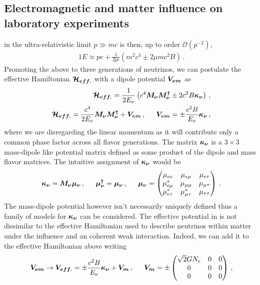 \subsection{Electromagnetic and matter influence on laboratory experiments}\label{rel}
\noindent{} in the ultra-relativistic limit $p\gg mc$ is then, up to order $\mathcal{O}(p^{-2})$,
\begin{alignat}{1}
	\label{eigen:3} E \approx pc + \frac{1}{2pc}\left(m^{2}c^{4}\pm2\mu mc^{2}B\right)\,.
\end{alignat}
Promoting the above to three generations of neutrinos, we can postulate the effective Hamiltonian $\boldsymbol{\mathcal{H}_{eff.}}$ with a dipole potential $\boldsymbol{V_{em}}$ as
\begin{alignat}{1}
	\label{heff:1} \bb{\mathcal{H}_{eff.}}=\frac{1}{2E_{\nu}}\left(c^{4}\bb{M_{\nu}}\bb{M_{\nu}^{\dagger}}\pm2c^{2}B\bb{\kappa_{\nu}}\right)\,,\\
	\label{heff:2} \bb{\mathcal{H}_{eff.}}=\frac{c^{4}}{2E_{\nu}}\bb{M_{\nu}}\bb{M_{\nu}^{\dagger}}+\bb{V_{em}}\,,\indent\bb{V_{em}}=\pm\frac{c^{2}B}{E_{\nu}}\bb{\kappa_{\nu}}\,,
\end{alignat}
where we are disregarding the linear momentum as it will contribute only a common phase factor across all flavor generations. \ar The matrix $\boldsymbol{\kappa_{\nu}}$ is a $3\times3$ mass-dipole like potential matrix defined as some product of the dipole and mass flavor matrices. The intuitive assignment of $\boldsymbol{\kappa_{\nu}}$ would be
\begin{alignat}{1}
	\label{kappa:1} \bb{\kappa_{\nu}} = \bb{M_\nu}\bb{\mu_{\nu}}\,,\indent\bb{\mu_{\nu}^{\dagger}}=\bb{\mu_{\nu}}\,,\indent\bb{\mu_{\nu}}=
	\begin{pmatrix}
		\mu_{ee} & \mu_{e\mu} & \mu_{e\tau} \\
		\mu_{e\mu}^{*} & \mu_{\mu\mu} & \mu_{\mu\tau} \\
		\mu_{e\tau}^{*} & \mu_{\mu\tau}^{*} & \mu_{\tau\tau}
	\end{pmatrix}\,.
\end{alignat}
The mass-dipole potential however isn't necessarily uniquely defined thus a family of models for $\boldsymbol{\kappa_{\nu}}$ can be considered. The effective potential in  is not dissimilar to the effective Hamiltonian used to describe neutrinos within matter under the influence and an coherent weak interaction. \ar Indeed, we can add it to the effective Hamiltonian above writing
\begin{alignat}{1}
	\label{matter:1} \bb{V_{em}}\rightarrow\bb{V_{eff.}}=\pm\frac{c^{2}B}{E_{\nu}}\bb{\kappa_{\nu}}+\bb{V_{m}}\,,\indent\bb{V_{m}}=\pm
	\begin{pmatrix}
		\sqrt{2}GN_{e} & 0 & 0\\
		0 & 0 & 0\\
		0 & 0 & 0
	\end{pmatrix}\,,
\end{alignat}
